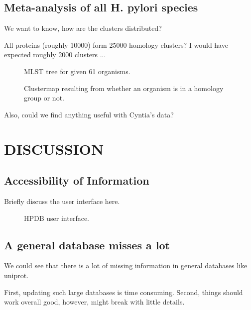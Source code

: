\documentclass[a4,center,fleqn]{NAR}
\begin{document}
\subsection{Meta-analysis of all H. pylori species}

We want to know, how are the clusters distributed?

All proteins (roughly 10000) form 25000 homology clusters?
I would have expected roughly 2000 clusters ...

\begin{figure}
	\caption{MLST tree for given 61 organisms.}
	\label{fig:mlst_tree}
\end{figure}

\begin{figure*}[t]
	\begin{center}
	\end{center}
	\caption{
		Clustermap resulting from whether an organism is in a homology group or not.
	}
	\label{fig:hom_clustermap}
\end{figure*}

Also, could we find anything useful with Cyntia's data? 

\section{DISCUSSION}

\subsection{Accessibility of Information}

Briefly discuss the user interface here.

\begin{figure}
	\caption{HPDB user interface.}
	\label{fig:db_ui}
\end{figure}

\subsection{A general database misses a lot}
We could see that there is a lot of missing information in general databases like uniprot.

First, updating such large databases is time consuming.
Second, things should work overall good, however, might break with little details.
\end{document}

